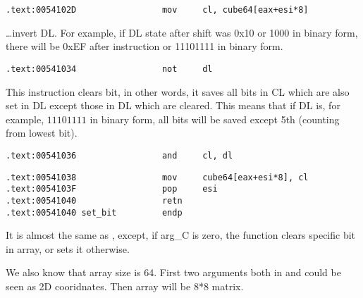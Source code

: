 
\begin{lstlisting}
.text:0054102D                 mov     cl, cube64[eax+esi*8]
\end{lstlisting}

{\dots invert DL. For example, if DL state after shift was 0x10 or 1000 in binary form, 
there will be 0xEF after \NOT instruction or 11101111 in binary form.}

\begin{lstlisting}
.text:00541034                 not     dl
\end{lstlisting}

{This instruction clears bit, in other words, it saves all bits in CL which are also set in 
DL except those in DL which are cleared. This means that if DL is, for example, 
$11101111$ in binary form, all bits will be saved except 5th (counting from lowest bit).}

\begin{lstlisting}
.text:00541036                 and     cl, dl
\end{lstlisting}


\begin{lstlisting}
.text:00541038                 mov     cube64[eax+esi*8], cl
.text:0054103F                 pop     esi
.text:00541040                 retn
.text:00541040 set_bit         endp
\end{lstlisting}

{It is almost the same as , except, if arg\_C is zero, the function clears specific bit in array, 
or sets it otherwise.}

{We also know that array size is 64. First two arguments both in  and  
could be seen as 2D cooridnates. Then array will be 8*8 matrix.}

